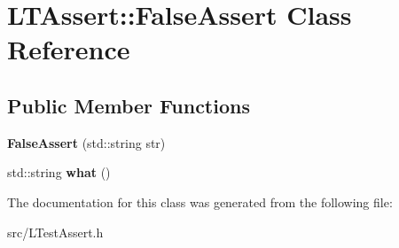 \hypertarget{class_l_t_assert_1_1_false_assert}{\section{L\-T\-Assert\-:\-:False\-Assert Class Reference}
\label{class_l_t_assert_1_1_false_assert}
}
\subsection*{Public Member Functions}
\begin{DoxyCompactItemize}
\item 
\hypertarget{class_l_t_assert_1_1_false_assert_a523405c01293a0d3f351fe0c4021d1be}{{\bfseries False\-Assert} (std\-::string str)}\label{class_l_t_assert_1_1_false_assert_a523405c01293a0d3f351fe0c4021d1be}

\item 
\hypertarget{class_l_t_assert_1_1_false_assert_a2b34e78516a72220250fc09b6ae5c302}{std\-::string {\bfseries what} ()}\label{class_l_t_assert_1_1_false_assert_a2b34e78516a72220250fc09b6ae5c302}

\end{DoxyCompactItemize}


The documentation for this class was generated from the following file\-:\begin{DoxyCompactItemize}
\item 
src/L\-Test\-Assert.\-h\end{DoxyCompactItemize}
